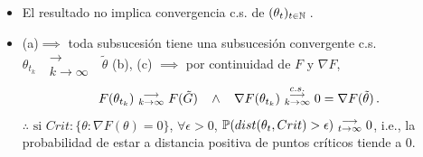 \begin{remark}
\beforeitemize
\begin{itemize}
    \item El resultado no implica convergencia c.s. de $(\theta_t)_{t\in\N}$\,.
    \item (a)$\implies$ toda subsucesión tiene una subsucesión convergente c.s. $\theta_{t_k}\mbox{ }\substack{\longrightarrow \\ k\to\infty}\mbox{ } \tilde{\theta}$
    \newline (b), (c) $\implies$ por continuidad de $F$ y $\nabla F$,
    $$F(\theta_{t_k})\mbox{ }\substack{\longrightarrow \\ k\to\infty}\mbox{ }F(\tilde{G})\espacio\land\espacio \nabla F(\theta_{t_k})\mbox{ }\overset{c.s.}{\substack{\longrightarrow \\k \to \infty}}\mbox{ }0=\nabla F(\tilde{\theta})\,.$$
    \newline $\therefore\mbox{ si }Crit:\{\theta:\nabla F(\theta)=0\}$, $\forall \epsilon>0$, $\P(dist(\theta_t,Crit)>\epsilon)\mbox{ }\substack{\longrightarrow \\ t\to\infty}\mbox{ }0$\espacio, i.e., la probabilidad de estar a distancia positiva de puntos críticos tiende a $0$.
\end{itemize}
\end{remark}
